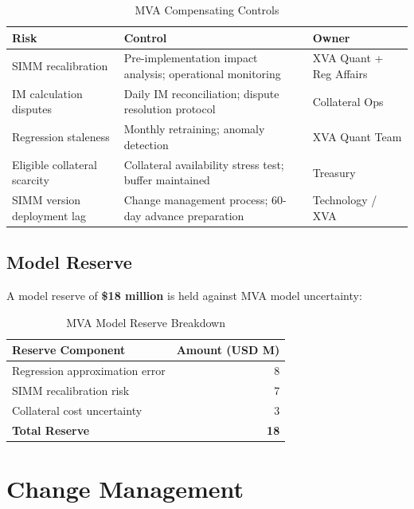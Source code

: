 \documentclass[11pt,a4paper]{article}
\begin{document}
\begin{table}[h!]
\centering
\caption{MVA Compensating Controls}
\begin{tabular}{@{}p{4.5cm}p{6cm}p{3.5cm}@{}}
\toprule
\textbf{Risk} & \textbf{Control} & \textbf{Owner} \\
\midrule
SIMM recalibration & Pre-implementation impact analysis; operational monitoring & XVA Quant + Reg Affairs \\[4pt]
IM calculation disputes & Daily IM reconciliation; dispute resolution protocol & Collateral Ops \\[4pt]
Regression staleness & Monthly retraining; anomaly detection & XVA Quant Team \\[4pt]
Eligible collateral scarcity & Collateral availability stress test; buffer maintained & Treasury \\[4pt]
SIMM version deployment lag & Change management process; 60-day advance preparation & Technology / XVA \\
\bottomrule
\end{tabular}
\end{table}

\subsection{Model Reserve}

A model reserve of \textbf{\$18 million} is held against MVA model uncertainty:

\begin{table}[h!]
\centering
\caption{MVA Model Reserve Breakdown}
\begin{tabular}{@{}lr@{}}
\toprule
\textbf{Reserve Component} & \textbf{Amount (USD M)} \\
\midrule
Regression approximation error  & 8 \\
SIMM recalibration risk         & 7 \\
Collateral cost uncertainty     & 3 \\
\midrule
\textbf{Total Reserve}          & \textbf{18} \\
\bottomrule
\end{tabular}
\end{table}

\section{Change Management}
\end{document}
